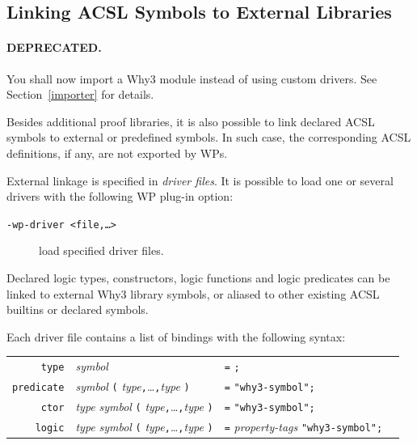 \subsection{Linking \textsf{ACSL} Symbols to External Libraries}
\label{drivers}

\paragraph{DEPRECATED.} You shall now import a Why3 module
instead of using custom drivers. See Section~\ref{importer} for details.

Besides additional proof libraries, it is also possible to
link declared \textsf{ACSL} symbols to external or predefined
symbols. In such case, the corresponding \textsf{ACSL} definitions,
if any, are not exported by \textsf{WP}s.

External linkage is specified in \emph{driver files}. It is possible
to load one or several drivers with the following \textsf{WP} plug-in option:
\begin{description}
\item[\tt -wp-driver <file,\ldots>] load specified driver files.
\end{description}

Declared logic types, constructors, logic functions and logic predicates can be
linked to external Why3 library symbols, or aliased to other existing ACSL
builtins or declared symbols.

\newcommand{\ccc}{\texttt{,}\ldots\texttt{,}}
\newcommand{\user}{\texttt{"why3-symbol"}}
Each driver file contains a list of bindings with the following syntax:
\begin{center}
  \begin{tabular}{|rlll}
  \rule{0em}{1.2em}
  \texttt{type} & \textit{symbol} & \verb'='  \verb';' \\
  \texttt{predicate} & \textit{symbol}
                   \verb'(' \textit{type}\ccc\textit{type} \verb')'
                 & \verb'=' \user \verb';' \\
  \texttt{ctor} & \textit{type} \textit{symbol}
                   \verb'(' \textit{type}\ccc\textit{type} \verb')'
                 & \verb'=' \user \verb';' \\
  \texttt{logic} & \textit{type} \textit{symbol}
                   \verb'(' \textit{type}\ccc\textit{type} \verb')'
                 & \verb'=' \textit{property-tags} \user \verb';' \\
  \end{tabular}
\end{center}

